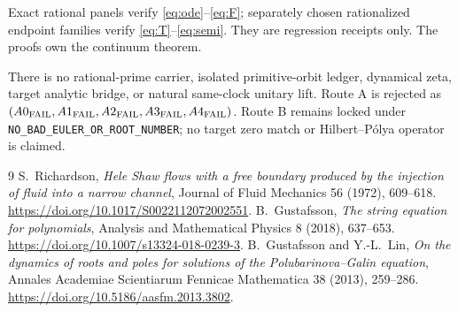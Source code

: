 \documentclass[10pt]{article}
\begin{document}
Exact rational panels verify \eqref{eq:ode}--\eqref{eq:F}; separately
chosen rationalized endpoint families verify \eqref{eq:T}--\eqref{eq:semi}.
They are regression receipts only.  The proofs own the continuum theorem.

There is no rational-prime carrier, isolated primitive-orbit ledger,
dynamical zeta, target analytic bridge, or natural same-clock unitary lift.
Route A is rejected as
$(A0_{\rm FAIL},A1_{\rm FAIL},A2_{\rm FAIL},A3_{\rm FAIL},A4_{\rm FAIL})$.
Route B remains locked under \texttt{NO\_BAD\_EULER\_OR\_ROOT\_NUMBER}; no
target zero match or Hilbert--P\'olya operator is claimed.

\begin{thebibliography}{9}\small
{} S.~Richardson,
\emph{Hele Shaw flows with a free boundary produced by the injection of
fluid into a narrow channel}, Journal of Fluid Mechanics 56 (1972), 609--618.
\url{https://doi.org/10.1017/S0022112072002551}.
 B.~Gustafsson,
\emph{The string equation for polynomials}, Analysis and Mathematical
Physics 8 (2018), 637--653.
\url{https://doi.org/10.1007/s13324-018-0239-3}.
 B.~Gustafsson and Y.-L.~Lin,
\emph{On the dynamics of roots and poles for solutions of the
Polubarinova--Galin equation}, Annales Academiae Scientiarum Fennicae
Mathematica 38 (2013), 259--286.
\url{https://doi.org/10.5186/aasfm.2013.3802}.
\end{thebibliography}
\fi
\end{document}
